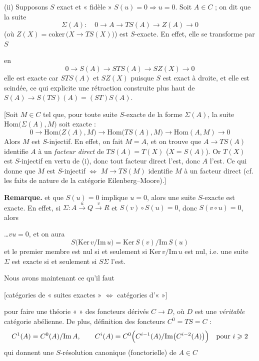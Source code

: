 \documentclass[11pt,a4paper]{article}
\begin{document}
(ii) Supposons $S$ exact  et « fidèle » 
$S(u) = 0 \Rightarrow u = 0$. Soit $A \in C$ ; on dit que la suite
\[
  \Sigma(A) : \quad 0 \longrightarrow A \longrightarrow TS(A)
  \longrightarrow Z(A) \longrightarrow 0
  \tag{3}
\]
(où $Z(X) = \mathrm{coker}\,\bigl( X \to TS(X) \bigr)$) est $S$-exacte. En
effet, elle se transforme par $S$

en
\[
  0 \longrightarrow S(A) \longrightarrow STS(A) \longrightarrow SZ(X)
  \longrightarrow 0
\]
elle est exacte car \ill{} $STS(A)$ et $SZ(X)$ puisque $S$ est exact à droite,
et \ill{} elle est scindée, ce qui \ill{} explicite une rétraction construite
plus haut de $S(A) \to S(TS)(A) = (ST)S(A)$.

[Soit $M \in C$ tel que, pour toute suite $S$-exacte de la forme $\Sigma(A)$,
la suite $\mathrm{Hom}\bigl( \Sigma(A), M \bigr)$ soit exacte :
\[
  0 \longrightarrow \mathrm{Hom}\bigl( Z(A), M \bigr) \longrightarrow
  \mathrm{Hom}\bigl( TS(A), M \bigr) \longrightarrow
  \mathrm{Hom}(A, M) \longrightarrow 0
\]
Alors $M$ est $S$-injectif. En effet, on fait $M = A$, et on trouve que
$A \to TS(A)$ identifie $A$ à un \emph{facteur direct} de $TS(A) = T(X)$
($X = S(A)$). Or $T(X)$ est $S$-injectif en vertu de (i), donc tout facteur
direct l'est, donc $A$ l'est. Ce qui \struck{$\Rightarrow$} donne que
$M$ est $S$-injectif $\Longleftrightarrow$ $M \to TS(M)$ \ill{} identifie $M$ à
un facteur direct (cf. les faits de nature \ill{} de la catégorie
Eilenberg--Moore).]

\textbf{Remarque.} \ill{} 
  et que
$S(u) = 0$ implique $u = 0$, alors une suite $S$-exacte est exacte. En effet,
si $\Sigma : A \xrightarrow{u} Q \xrightarrow{v} R$ et $S(v) \circ S(u) = 0$,
donc $S(v \circ u) = 0$, alors

\struck{\ill{}}

\ldots $v u = 0$, et on aura
\[
  S\bigl( \mathrm{Ker}\, v / \mathrm{Im}\, u \bigr) =
  \mathrm{Ker}\, S(v) / \mathrm{Im}\, S(u)
\]
et le  premier membre est nul si et seulement si
$\mathrm{Ker}\, v / \mathrm{Im}\, u$ est nul, i.e. une suite $\Sigma$ est
exacte si et seulement si $S\Sigma$ l'est.

Nous avons maintenant ce qu'il faut

[catégories de « suites exactes » $\Longleftrightarrow$ catégories
d'« \ill{} »]

pour faire une théorie «  » des foncteurs dérivés
$C \to D$, où $D$ est une \emph{véritable} catégorie abélienne. De plus,
définition des foncteurs $C^{0} = TS = C$ :
\[
  C^{1}(A) = C^{0}(A) / \mathrm{Im}\, A , \qquad
  C^{i}(A) = C^{0}\Bigl( C^{i-1}(A) / \mathrm{Im}\bigl( C^{i-2}(A) \bigr) \Bigr)
  \quad \text{pour } i \geqslant 2
\]
qui donnent une $S$-résolution canonique (fonctorielle) de $A \in C$
\end{document}
